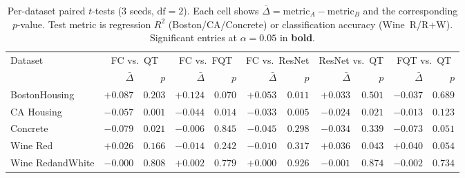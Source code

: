 \begin{table}[t]
\centering
\caption{Per-dataset paired $t$-tests (3 seeds, $\mathrm{df}{=}2$). Each cell shows $\bar{\Delta} = \text{metric}_A - \text{metric}_B$ and the corresponding $p$-value. Test metric is regression $R^2$ (Boston/CA/Concrete) or classification accuracy (Wine~R/R+W). Significant entries at $\alpha{=}0.05$ in \textbf{bold}.}
\label{tab:ttest-per-dataset}
\small
\begin{tabular}{lrrrrrrrrrr}
\toprule
Dataset & \multicolumn{2}{c}{FC vs.\ QT} & \multicolumn{2}{c}{FC vs.\ FQT} & \multicolumn{2}{c}{FC vs.\ ResNet} & \multicolumn{2}{c}{ResNet vs.\ QT} & \multicolumn{2}{c}{FQT vs.\ QT} \\
 & $\bar{\Delta}$ & $p$ & $\bar{\Delta}$ & $p$ & $\bar{\Delta}$ & $p$ & $\bar{\Delta}$ & $p$ & $\bar{\Delta}$ & $p$ \\
\midrule
BostonHousing & $+0.087$ & $0.203$ & $+0.124$ & $0.070$ & $\mathbf{+0.053}$ & $\mathbf{0.011}$ & $+0.033$ & $0.501$ & $-0.037$ & $0.689$ \\
CA Housing & $\mathbf{-0.057}$ & $\mathbf{0.001}$ & $\mathbf{-0.044}$ & $\mathbf{0.014}$ & $\mathbf{-0.033}$ & $\mathbf{0.005}$ & $\mathbf{-0.024}$ & $\mathbf{0.021}$ & $-0.013$ & $0.123$ \\
Concrete & $\mathbf{-0.079}$ & $\mathbf{0.021}$ & $-0.006$ & $0.845$ & $-0.045$ & $0.298$ & $-0.034$ & $0.339$ & $-0.073$ & $0.051$ \\
Wine Red & $+0.026$ & $0.166$ & $-0.014$ & $0.242$ & $-0.010$ & $0.317$ & $\mathbf{+0.036}$ & $\mathbf{0.043}$ & $+0.040$ & $0.054$ \\
Wine RedandWhite & $-0.000$ & $0.808$ & $+0.002$ & $0.779$ & $+0.000$ & $0.926$ & $-0.001$ & $0.874$ & $-0.002$ & $0.734$ \\
\bottomrule
\end{tabular}
\vspace{-5pt}
\end{table}